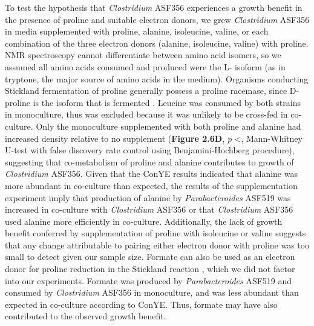 \documentclass[11pt,twocolumn,notitlepage,openany,twoside]{book}
\begin{document}
\begin{refsection}
To test the hypothesis that \textit{Clostridium} ASF356 experiences a growth benefit in the presence of proline and suitable electron donors, we grew \textit{Clostridium} ASF356 in media supplemented with proline, alanine, isoleucine, valine, or each combination of the three electron donors (alanine, isoleucine, valine) with proline. NMR spectroscopy cannot differentiate between amino acid isomers, so we assumed all amino acids consumed and produced were the L- isoform (as in tryptone, the major source of amino acids in the medium). Organisms conducting Stickland fermentation of proline generally possess a proline racemase, since D-proline is the isoform that is fermented \cite{Watanabe2015-wa}. Leucine was consumed by both strains in monoculture, thus was excluded because it was unlikely to be cross-fed in co-culture. Only the monoculture supplemented with both proline and alanine had increased density relative to no supplement (\textbf{Figure 2.6D}, \textit{p} \textless{}, Mann-Whitney U-test with false discovery rate control using Benjamini-Hochberg procedure), suggesting that co-metabolism of proline and alanine contributes to growth of \textit{Clostridium} ASF356. Given that the ConYE results indicated that alanine was more abundant in co-culture than expected, the results of the supplementation experiment imply that production of alanine by \textit{Parabacteroides} ASF519 was increased in co-culture with \textit{Clostridium} ASF356 or that \textit{Clostridium} ASF356 used alanine more efficiently in co-culture. Additionally, the lack of growth benefit conferred by supplementation of proline with isoleucine or valine suggests that any change attributable to pairing either electron donor with proline was too small to detect given our sample size. Formate can also be used as an electron donor for proline reduction in the Stickland reaction \cite{Kabisch1999-jf}, which we did not factor into our experiments. Formate was produced by \textit{Parabacteroides} ASF519 and consumed by \textit{Clostridium} ASF356 in monoculture, and was less abundant than expected in co-culture according to ConYE. Thus, formate may have also contributed to the observed growth benefit.


\end{refsection}
\end{document}
